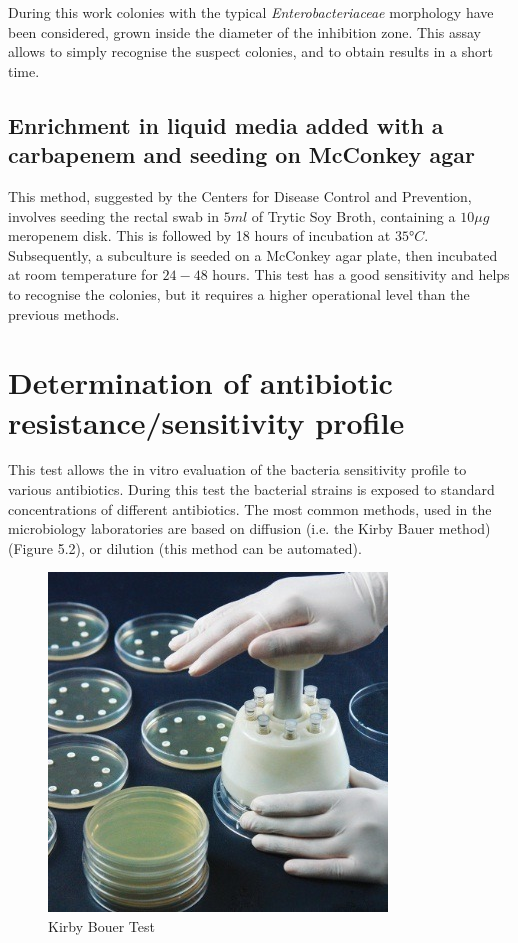 \documentclass[11pt]{report}
\begin{document}
During this work colonies with the typical \emph{Enterobacteriaceae} morphology have been considered, grown inside the diameter of the inhibition zone.
This assay allows to simply recognise the suspect colonies, and to obtain results in a short time.

\subsection{Enrichment in liquid media added with a carbapenem and seeding on McConkey agar}

This method, suggested by the Centers for Disease Control and Prevention, involves seeding the rectal swab in $5ml$ of Trytic Soy Broth, containing a $10\mu g$ meropenem disk.
This is followed by 18 hours of incubation at $35°C$.
Subsequently, a subculture is seeded on a McConkey agar plate, then incubated at room temperature for $24-48$ hours.
This test has a good sensitivity and helps to recognise the colonies, but it requires a higher operational level than the previous methods.

\section{Determination of antibiotic resistance/sensitivity profile}
This test allows the in vitro evaluation of the bacteria sensitivity profile to various antibiotics.
During this test the bacterial strains is exposed to standard concentrations of different antibiotics.
The most common methods, used in the microbiology laboratories are based on diffusion (i.e. the Kirby Bauer method) (Figure 5.2), or dilution (this method can be automated).

\begin{figure}[htp]
\centering
\includegraphics[scale=0.800]{img/Kirby_Bouer.jpg}
\caption{Kirby Bouer Test}
\label{}
\end{figure}
\end{document}
